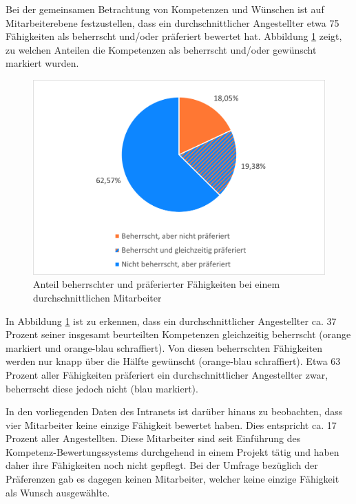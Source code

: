 Bei der gemeinsamen Betrachtung von Kompetenzen und Wünschen ist auf Mitarbeiterebene festzustellen, dass ein durchschnittlicher Angestellter etwa 75 Fähigkeiten als beherrscht und/oder präferiert bewertet hat. Abbildung \ref{fig:ergebnisse:analyse:abb3} zeigt, zu welchen Anteilen die Kompetenzen als beherrscht und/oder gewünscht markiert wurden.

\begin{figure}[h]
	\centering
	\includegraphics[width=1\textwidth]{gfx/auswertung-anteil-an-faehigkeiten.png}
	\caption{Anteil beherrschter und präferierter Fähigkeiten bei einem durchschnittlichen Mitarbeiter}
	\label{fig:ergebnisse:analyse:abb3}
\end{figure}

In Abbildung \ref{fig:ergebnisse:analyse:abb3} ist zu erkennen, dass ein durchschnittlicher Angestellter ca. 37 Prozent seiner insgesamt beurteilten Kompetenzen gleichzeitig beherrscht (orange markiert und orange-blau schraffiert). Von diesen beherrschten Fähigkeiten werden nur knapp über die Hälfte gewünscht (orange-blau schraffiert). Etwa 63 Prozent aller Fähigkeiten präferiert ein durchschnittlicher Angestellter zwar, beherrscht diese jedoch nicht (blau markiert).

In den vorliegenden Daten des Intranets ist darüber hinaus zu beobachten, dass vier Mitarbeiter keine einzige Fähigkeit bewertet haben. Dies entspricht ca. 17 Prozent aller Angestellten. Diese Mitarbeiter sind seit Einführung des Kompetenz-Bewertungssystems durchgehend in einem Projekt tätig und haben daher ihre Fähigkeiten noch nicht gepflegt. Bei der Umfrage bezüglich der Präferenzen gab es dagegen keinen Mitarbeiter, welcher keine einzige Fähigkeit als Wunsch ausgewählte.

